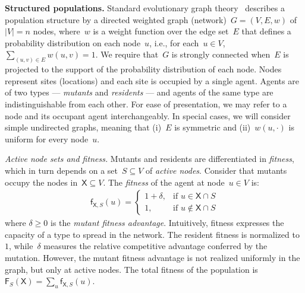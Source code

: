 \documentclass[letterpaper]{article}
\newcommand{\TotalFitness}{\mathsf{F}}
\newcommand{\Fitness}{\mathsf{f}}
\newcommand{\X}{\mathsf{X}}
\newcommand{\Paragraph}[1]{{\smallskip\noindent\bf #1}}
\newcommand{\SubParagraph}[1]{{\smallskip\noindent\em #1}}
\newcommand{\FitAdv}{\delta}
\newcommand{\Weight}{w}
\begin{document}
\Paragraph{Structured populations.} Standard evolutionary graph theory~\cite{Nowak2006} describes a population structure by a directed weighted graph (network)~$G=(V,E, \Weight)$ of~$|V|=n$ nodes, where~$\Weight$ is a weight function over the edge set~$E$ that defines a probability distribution on each node~$u$, i.e., for each~$u\in V$, $\sum_{(u,v)\in E}\Weight(u,v)=1$.
We require that~$G$ is strongly connected when~$E$ is projected to the support of the probability distribution of each node. Nodes represent sites (locations) and each site is occupied by a single agent. Agents are of two types --- \emph{mutants} and \emph{residents} --- and agents of the same type are indistinguishable from each other.
For ease of presentation, we may refer to a node and its occupant agent interchangeably.
In special cases, we will consider simple undirected graphs, meaning that (i)~$E$ is symmetric and (ii)~$\Weight(u,\cdot)$ is uniform for every node~$u$.


\SubParagraph{Active node sets and fitness.} Mutants and residents are differentiated in \emph{fitness}, which in turn depends on a set~$S \!\subseteq\! V$ of \emph{active nodes}.
Consider that mutants occupy the nodes in~$\X \!\subseteq\! V$.
The \emph{fitness} of the agent at node~$u \!\in\! V$ is:
\begin{align}
\Fitness_{\X,S}(u)=
\begin{cases}
1+\FitAdv, & \text{if } u\in \X\cap S\\
1,         & \text{if } u\not \in \X\cap S
\end{cases}
\end{align}
where $\FitAdv\geq 0$ is the \emph{mutant fitness advantage}.
Intuitively, fitness expresses the capacity of a type to spread in the network.
The resident fitness is normalized to~$1$, while~$\FitAdv$ measures the relative competitive advantage conferred by the mutation.
However, the mutant fitness advantage is not realized uniformly in the graph, but only at active nodes.
The total fitness of the population is $\TotalFitness_{S}(\X) = \sum_{u}\Fitness_{\X,S}(u)$.
\end{document}
